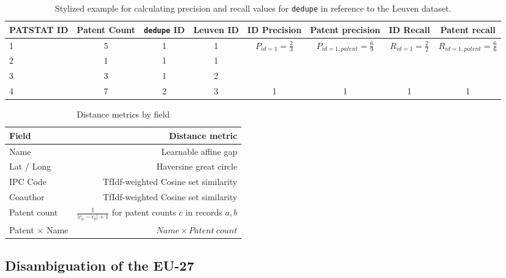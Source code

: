 \documentclass[11pt]{article}
\begin{document}
\begin{landscape}
  \begin{table}[t]
    \footnotesize
    \centering
    \begin{tabular}{l|c|c|c||c|c|c|c}
      PATSTAT ID & Patent Count & \texttt{dedupe} ID & Leuven ID & ID Precision &
      Patent precision & ID Recall & Patent recall\\
      \hline
      1 & 5 & 1 & 1 &
      \multirow{3}{*}{$P_{id=1} = \frac{2}{3}$} &
      \multirow{3}{*}{$P_{id=1, patent} = \frac{6}{9}$} &     
      \multirow{3}{*}{$R_{id=1} = \frac{2}{2}$} & 
      \multirow{3}{*}{$R_{id=1, patent} = \frac{6}{6}$}\\
      2 & 1 & 1 & 1 & & & &\\
      3 & 3 & 1 & 2 & & & &\\
      \hline
      4 & 7 & 2 & 3 & 1 & 1 &1 & 1 \\
    \end{tabular}
    \caption{Stylized example for calculating precision and recall values for \texttt{dedupe} in
      reference to the Leuven dataset.}
    \label{tab:precision-calc}
  \end{table}

\begin{table}[t]
  \centering
{\footnotesize
  \begin{tabular}{lr}
    Field & Distance metric \\
    \hline
    Name  & Learnable affine gap \\
    Lat / Long & Haversine great circle \\
    IPC Code & TfIdf-weighted Cosine set similarity \\
    Coauthor & TfIdf-weighted Cosine set similarity \\
    Patent count & $\frac{1}{\left|c_a -
      c_b\right| + 1}$ for patent counts $c$ in
    records $a, b$\\
    Patent $\times$ Name & $Name \times Patent~count$ \\
    \hline
  \end{tabular}
}
  \caption{Distance metrics by field}
  \label{tab:dist-metrics}
\end{table}

\end{landscape}


\subsection{Disambiguation of the EU-27}
\label{sec:core-countries}
\end{document}
